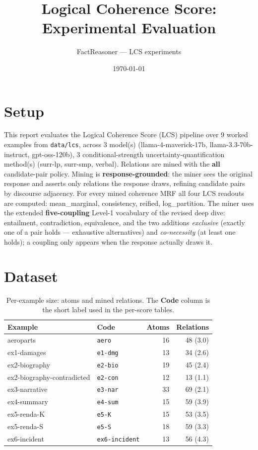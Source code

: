\documentclass[11pt]{article}
\title{Logical Coherence Score: Experimental Evaluation}
\author{FactReasoner --- LCS experiments}
\date{\today}
\begin{document}
\maketitle

\section{Setup}

This report evaluates the Logical Coherence Score (LCS) pipeline over 9 worked examples from \texttt{data/lcs}, across 3 model(s) (llama-4-maverick-17b, llama-3.3-70b-instruct, gpt-oss-120b), 3 conditional-strength uncertainty-quantification method(s) (surr-lp, surr-smp, verbal). Relations are mined with the \textbf{all} candidate-pair policy. Mining is \textbf{response-grounded}: the miner sees the original response and asserts only relations the response draws, refining candidate pairs by discourse adjacency. For every mined coherence MRF all four LCS readouts are computed: mean\_marginal, consistency, reified, log\_partition. The miner uses the extended \textbf{five-coupling} Level-1 vocabulary of the revised deep dive: entailment, contradiction, equivalence, and the two additions \emph{exclusive} (exactly one of a pair holds --- exhaustive alternatives) and \emph{co-necessity} (at least one holds); a coupling only appears when the response actually draws it. 

\section{Dataset}

\begin{table}[htbp]
\centering
\small
\caption{Per-example size: atoms and mined relations. The \textbf{Code} column is the short label used in the per-score tables.}
\label{tab:coverage}
\begin{tabular}{llrr}
\toprule
Example & Code & Atoms & Relations \\
\midrule
aeroparts & \texttt{aero} & 16 & 48 (3.0) \\
ex1-damages & \texttt{e1-dmg} & 13 & 34 (2.6) \\
ex2-biography & \texttt{e2-bio} & 19 & 45 (2.4) \\
ex2-biography-contradicted & \texttt{e2-con} & 12 & 13 (1.1) \\
ex3-narrative & \texttt{e3-nar} & 33 & 69 (2.1) \\
ex4-summary & \texttt{e4-sum} & 15 & 59 (3.9) \\
ex5-renda-K & \texttt{e5-K} & 15 & 53 (3.5) \\
ex5-renda-S & \texttt{e5-S} & 18 & 59 (3.3) \\
ex6-incident & \texttt{ex6-incident} & 13 & 56 (4.3) \\
\bottomrule
\end{tabular}
\end{table}
\end{document}
